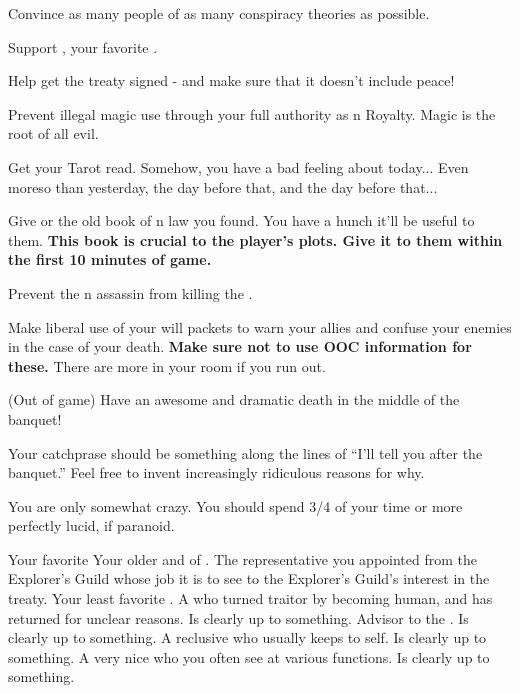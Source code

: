 \documentclass[char]{NeptuneBall}
\begin{document}
\begin{itemz}[Goals]
  \item Convince as many people of as many conspiracy theories as possible.
  \item Support \cPrincess{}, your favorite \cPrincess{\nephew}.
  \item Help \cKing{} get the treaty signed - and make sure that it doesn't include peace!
	\item Prevent illegal magic use through your full authority as \pAtlantis{}n Royalty. Magic is the root of all evil.
	\item Get your Tarot read. Somehow, you have a bad feeling about today... Even moreso than yesterday, the day before that, and the day before that...
	\item Give \cPrincess{} or \cDiplomat{} the old book of \pPacifica{}n law you found. You have a hunch it'll be useful to them. {\bf This book is crucial to the player's plots. Give it to them within the first 10 minutes of game.}
	\item Prevent the \pPacifica{}n assassin from killing the \cKing{\King}.
	\item Make liberal use of your will packets to warn your allies and confuse your enemies in the case of your death. {\bf Make sure not to use OOC information for these.} There are more in your room if you run out.
	\item (Out of game) Have an awesome and dramatic death in the middle of the banquet!
\end{itemz}

\begin{itemz}[Notes]
  \item Your catchprase should be something along the lines of ``I'll tell you after the banquet.'' Feel free to invent increasingly ridiculous reasons for why.
  \item You are only somewhat crazy. You should spend 3/4 of your time or more perfectly lucid, if paranoid.
\end{itemz}

\begin{contacts}
  \contact{\cPrincess{}} Your favorite \cPrincess{\nephew}
  \contact{\cKing{}} Your older \cKing{\sibling} and \cKing{\King} of \pAtlantis{}.
  \contact{\cPriest{}} The representative you appointed from the Explorer's Guild whose job it is to see to the Explorer's Guild's interest in the treaty.
	\contact{\cAriel{}} Your least favorite \cAriel{\nephew}. A \cAriel{\mer} who turned traitor by becoming human, and has returned for unclear reasons. Is clearly up to something.
	\contact{\cManta{}} Advisor to the \cKing{\King}. Is clearly up to something.
	\contact{\cQueen{}} A reclusive \cQueen{\mer} who usually keeps to \cQueen{\their}self. Is clearly up to something.
	\contact{\cWitch{}} A very nice \cWitch{\mer} who you often see at various functions. Is clearly up to something.
\end{contacts}
\end{document}
